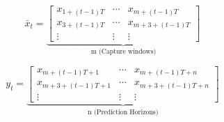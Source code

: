 \documentclass{article}
\begin{document}
\begin{equation}
\bar{x}_t = 
\underbrace{\begin{bmatrix}
    x_{1+(t-1)T} & \cdots & x_{m+(t-1)T}\\
    x_{3+(t-1)T} & \cdots & x_{m+3+(t-1)T}\\
    \vdots & \vdots & \vdots 
\end{bmatrix}}_{\text{m (Capture windows)}}
\label{eq:window}
\end{equation}

\begin{equation}
y_t = 
\underbrace{\begin{bmatrix}
    x_{m+(t-1)T + 1} & \cdots & x_{m+(t-1)T+ n}\\
    x_{m+3+(t-1)T + 1} & \cdots & x_{m+3+(t-1)T+ n}\\
    \vdots & \vdots & \vdots
\end{bmatrix}}_{\text{n (Prediction Horizons)}}
\label{eq:ywindow}
\end{equation}
\end{document}
